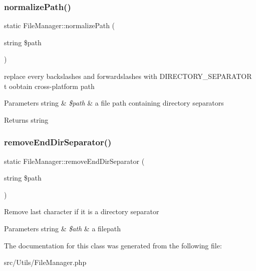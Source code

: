 \subsubsection{\texorpdfstring{normalize\+Path()}{normalizePath()}}
{\footnotesize\ttfamily static File\+Manager\+::normalize\+Path (\begin{DoxyParamCaption}\item[{string}]{\$path }\end{DoxyParamCaption})\hspace{0.3cm}{\ttfamily [static]}}

replace every backslashes and forwardslashes with D\+I\+R\+E\+C\+T\+O\+R\+Y\+\_\+\+S\+E\+P\+A\+R\+A\+T\+OR t oobtain cross-\/platform path 
\begin{DoxyParams}[1]{Parameters}
string & {\em \$path} & a file path containing directory separators \\
\hline
\end{DoxyParams}
\begin{DoxyReturn}{Returns}
string 
\end{DoxyReturn}
\mbox{\label{classFileManager_afe8493bc18be1fd7d7d431142c85008e}} 
\subsubsection{\texorpdfstring{remove\+End\+Dir\+Separator()}{removeEndDirSeparator()}}
{\footnotesize\ttfamily static File\+Manager\+::remove\+End\+Dir\+Separator (\begin{DoxyParamCaption}\item[{string}]{\$path }\end{DoxyParamCaption})\hspace{0.3cm}{\ttfamily [static]}}

Remove last character if it is a directory separator 
\begin{DoxyParams}[1]{Parameters}
string & {\em \$ath} & a filepath \\
\hline
\end{DoxyParams}


The documentation for this class was generated from the following file\+:\begin{DoxyCompactItemize}
\item 
src/\+Utils/File\+Manager.\+php\end{DoxyCompactItemize}
